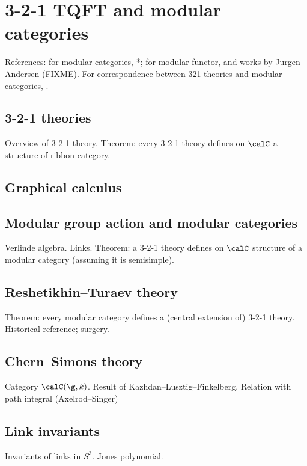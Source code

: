 \chapter{3-2-1 TQFT and modular categories}\label{c:321}

References: for modular categories, *{};
for modular functor,  and works by
Jurgen Andersen (FIXME). For correspondence between 321 theories
and modular categories, .

\section{3-2-1 theories}\label{s:321-theories}
Overview of 3-2-1 theory. Theorem:
every 3-2-1 theory defines on $\calC$ a structure of
ribbon category.

\section{Graphical calculus}\label{s:321-graphical}

\section{Modular group action and modular categories}\label{s:modular-group-action}
Verlinde algebra. Links.
Theorem: a 3-2-1 theory defines on $\calC$ structure of a modular category
(assuming it is semisimple).

\section{Reshetikhin--Turaev theory}\label{s:rt-theory}
Theorem: every modular category defines a (central extension of) 3-2-1 theory.
Historical reference; surgery.

\section{Chern--Simons theory}\label{s:chern-simons}
Category $\calC(\g, k)$. Result of Kazhdan--Lusztig--Finkelberg. Relation with
path integral (Axelrod--Singer)

\section{Link invariants}\label{s:link-invariants}
Invariants of links in $S^3$. Jones polynomial.